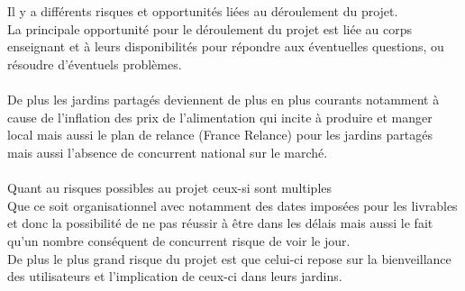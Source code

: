 \documentclass{report}
\begin{document}
\section*{\color{orange}{\Large Risques et opportunités}}
Il y a différents risques et opportunités liées au déroulement du projet. \\ 
La principale opportunité pour le déroulement du projet est liée au corps enseignant et à leurs disponibilités pour répondre aux éventuelles questions, ou résoudre d'éventuels problèmes. \\ \\ 
De plus les jardins partagés deviennent de plus en plus courants notamment à cause de l'inflation des prix de l’alimentation qui incite à produire et manger local mais aussi le plan de relance (France Relance) pour les jardins partagés mais aussi l'absence de concurrent national sur le marché. \\  \\ 
Quant au risques possibles au projet ceux-si sont multiples  \\ 
Que ce soit organisationnel avec notamment des dates imposées pour les livrables et donc la possibilité de ne pas réussir à être dans les délais mais aussi le fait qu'un nombre conséquent de concurrent risque de voir le jour. \\ 
De plus le plus grand risque du projet est que celui-ci repose sur la bienveillance des utilisateurs et l'implication de ceux-ci dans leurs jardins.
\end{document}
